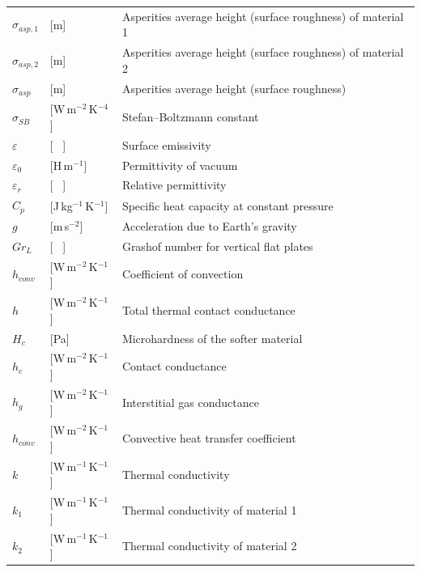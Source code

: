 \documentclass[review,times,sagev,doublespace]{sagej}
\begin{document}
\begin{longtable*}[c]{p{2cm} p{2cm} l}
		$\sigma_{asp,1}$ 	& [m] 						& Asperities average height (surface roughness) of material 1 \\
		$\sigma_{asp,2}$ 	& [m] 						& Asperities average height (surface roughness) of material 2 \\
		$\sigma_{asp}$ 		& [m] 						& Asperities average height (surface roughness)               \\
		$\sigma_{SB}$ 		& [W\,m$^{-2}$\,K$^{-4}$] 	& Stefan–Boltzmann constant                                   \\
		$\varepsilon$ 		& [ \ ] 					& Surface emissivity                                          \\
		$\varepsilon_0$ 	& [H\,m$^{-1}$] 			& Permittivity of vacuum                                      \\
		$\varepsilon_r$ 	& [ \ ] 					& Relative permittivity                                       \\
		$C_p$ 				& [J\,kg$^{-1}$\,K$^{-1}$] 	& Specific heat capacity at constant pressure                 \\
		$g$ 				& [m\,s$^{-2}$] 			& Acceleration due to Earth's gravity                         \\
		$Gr_L$ 				& [ \ ] 					& Grashof number for vertical flat plates                     \\
		$h_{conv}$ 			& [W\,m$^{-2}$\,K$^{-1}$] 	& Coefficient of convection                                   \\
		$h$ 				& [W\,m$^{-2}$\,K$^{-1}$] 	& Total thermal contact conductance                           \\
		$H_c$ 				& [Pa] 						& Microhardness of the softer material                        \\
		$h_c$ 				& [W\,m$^{-2}$\,K$^{-1}$] 	& Contact conductance                                         \\
		$h_g$ 				& [W\,m$^{-2}$\,K$^{-1}$] 	& Interstitial gas conductance                                \\
		$h_{conv}$ 			& [W\,m$^{-2}$\,K$^{-1}$] 	& Convective heat transfer coefficient                        \\
		$k$ 				& [W\,m$^{-1}$\,K$^{-1}$] 	& Thermal conductivity                                        \\
		$k_1$ 				& [W\,m$^{-1}$\,K$^{-1}$] 	& Thermal conductivity of material 1                          \\
		$k_2$ 				& [W\,m$^{-1}$\,K$^{-1}$] 	& Thermal conductivity of material 2                          \\

\end{longtable*}
\end{document}
